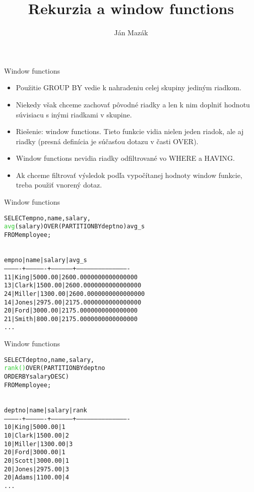 \documentclass[12pt]{beamer}
\title{Rekurzia a window functions}
\author{Ján Mazák}
\institute{FMFI UK Bratislava}
\date{}
\def\blue#1{\textcolor{Cerulean}{#1}}
\def\green#1{\textcolor{LimeGreen}{#1}}
\begin{document}
\frame{\titlepage}

\begin{frame}[fragile]{Window functions}
\begin{itemize}
\item Použitie GROUP BY vedie k nahradeniu celej skupiny jediným riadkom.
\item Niekedy však chceme zachovať pôvodné riadky a len k nim doplniť hodnotu súvisiacu s inými riadkami v skupine.
\item Riešenie: \alert{window functions}. Tieto funkcie vidia nielen jeden riadok, ale aj  riadky
    (presná definícia je súčasťou dotazu v časti \alert{OVER}).
\item Window functions nevidia riadky odfiltrované vo WHERE a HAVING.
\item Ak chceme filtrovať výsledok podľa vypočítanej hodnoty window funkcie, treba použiť vnorený dotaz.
\end{itemize}
\end{frame}

\begin{frame}[fragile]{Window functions}
\begin{alltt}
SELECT empno, name, salary,
       \green{avg}(salary) \alert{OVER (PARTITION BY deptno)} avg_s
FROM employee;
\end{alltt}
\begin{alltt}
\blue{
 empno |  name  | salary  |          avg_s
-------------+----------------+------------------+-------------------------------------------
    11 | King   | 5000.00 | 2600.0000000000000000
    13 | Clark  | 1500.00 | 2600.0000000000000000
    24 | Miller | 1300.00 | 2600.0000000000000000
    14 | Jones  | 2975.00 | 2175.0000000000000000
    20 | Ford   | 3000.00 | 2175.0000000000000000
    21 | Smith  |  800.00 | 2175.0000000000000000
    ...
}
\end{alltt}
\end{frame}

\begin{frame}[fragile]{Window functions}
\begin{alltt}
SELECT deptno, name, salary,
       \green{rank()} \alert{OVER (PARTITION BY deptno
                    ORDER BY salary DESC)}
FROM employee;
\end{alltt}
\begin{alltt}
\blue{
 deptno |  name  | salary  | rank
 -------------+----------------+------------------+-------------------------------------------
     10 | King   | 5000.00 |    1
     10 | Clark  | 1500.00 |    2
     10 | Miller | 1300.00 |    3
     20 | Ford   | 3000.00 |    1
     20 | Scott  | 3000.00 |    1
     20 | Jones  | 2975.00 |    3
     20 | Adams  | 1100.00 |    4
    ...
}
\end{alltt}
\end{frame}
\end{document}
